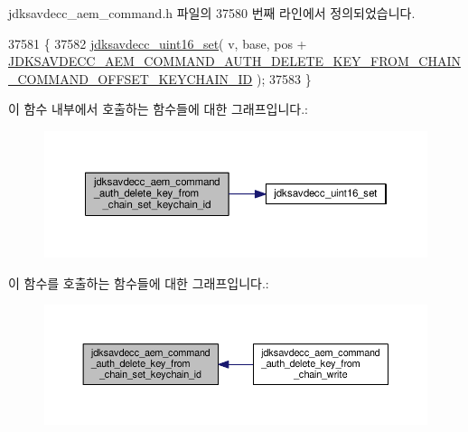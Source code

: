jdksavdecc\+\_\+aem\+\_\+command.\+h 파일의 37580 번째 라인에서 정의되었습니다.


\begin{DoxyCode}
37581 \{
37582     \hyperlink{group__endian_ga14b9eeadc05f94334096c127c955a60b}{jdksavdecc\_uint16\_set}( v, base, pos + 
      \hyperlink{group__command__auth__delete__key__from__chain_gac6246c3e92af99eb838bdc996829ada2}{JDKSAVDECC\_AEM\_COMMAND\_AUTH\_DELETE\_KEY\_FROM\_CHAIN\_COMMAND\_OFFSET\_KEYCHAIN\_ID}
       );
37583 \}
\end{DoxyCode}


이 함수 내부에서 호출하는 함수들에 대한 그래프입니다.\+:
\nopagebreak
\begin{figure}[H]
\begin{center}
\leavevmode
\includegraphics[width=350pt]{group__command__auth__delete__key__from__chain_ga363dacdcc27889331e0861ae0f44d4d0_cgraph}
\end{center}
\end{figure}




이 함수를 호출하는 함수들에 대한 그래프입니다.\+:
\nopagebreak
\begin{figure}[H]
\begin{center}
\leavevmode
\includegraphics[width=350pt]{group__command__auth__delete__key__from__chain_ga363dacdcc27889331e0861ae0f44d4d0_icgraph}
\end{center}
\end{figure}


